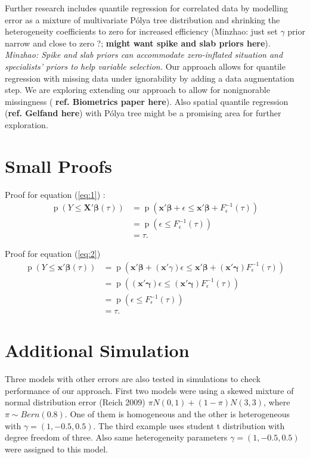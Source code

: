 \documentclass[12pt]{article}
\newcommand{\polya}{P\'{o}lya}
\DeclareMathOperator{\pr}{p}
\begin{document}
Further research includes quantile regression for correlated data by
modelling error as a mixture of multivariate \polya{} tree
distribution and shrinking the heterogeneity coefficients to zero for
increased efficiency (Minzhao: just set $\gamma$ prior narrow and
close to zero ?; {\bf might want spike and slab priors here}). {\it
  Minzhao: Spike and slab priors can accommodate zero-inflated
  situation and specialists' priors to help variable selection.} Our
approach allows for quantile regression with missing data under
ignorability by adding a data augmentation step.  We are exploring
extending our approach to allow for nonignorable missingness ({\bf
  ref. Biometrics paper here}).  Also spatial quantile regression
({\bf ref. Gelfand here}) with \polya{} tree might be a promising area
for further exploration.


% 


\appendix
\section{Small Proofs}

Proof for equation (\ref{eq:1}) :
\begin{align*}
  \pr (Y \le \bm{X'\beta}(\tau)) & = \pr \left( \bm{x'\beta} +
    \epsilon
    \le \bm{x'\beta} + F^{-1}_{\epsilon}(\tau) \right) \\
  & = \pr (\epsilon \le F^{-1}_{\epsilon}(\tau)) \\
  & = \tau.
\end{align*}

Proof for equation (\ref{eq:2})
\begin{align*}
  \pr (Y \le \bm{x'\beta}(\tau)) & = \pr \left( \bm{x'\beta} +
    (\bm{x}'\gamma) \epsilon \le \bm{x'\beta} + (\bm{x'\gamma})
    F^{-1}_{\epsilon}(\tau) \right) \\
  & = \pr \left( (\bm{x'\gamma}) \epsilon \le (\bm{x'\gamma})
    F^{-1}_{\epsilon}(\tau)  \right)\\
  & = \pr (\epsilon \le F^{-1}_{\epsilon}(\tau)) \\
  & = \tau .
\end{align*}

\section{Additional Simulation}

Three models with other errors are also tested in simulations to check
performance of our approach. First two models were using a skewed
mixture of normal distribution error (Reich 2009) $\pi N(0,1) +
(1-\pi) N(3,3)$, where $\pi \sim Bern(0.8)$. One of them is
homogeneous and the other is heterogeneous with $\gamma=(1,
-0.5,0.5)$. The third example uses student t distribution with degree
freedom of three. Also same heterogeneity parameters $\gamma=(1,
-0.5,0.5)$ were assigned to this model.
\end{document}
